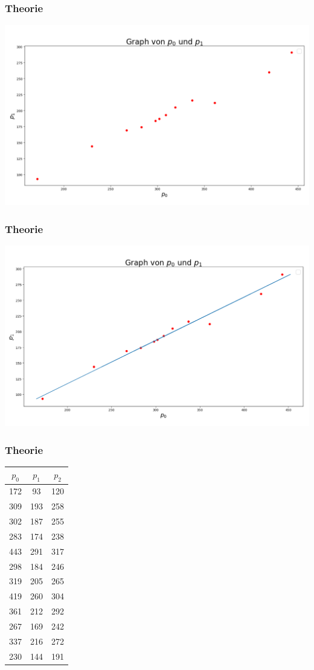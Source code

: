 \documentclass{beamer}
\begin{document}
\begin{frame}
    \centering
    \frametitle{Theorie}
    \includegraphics[width=\textwidth]{scatter.png}
\end{frame}

\begin{frame}
    \frametitle{Theorie}
    \includegraphics[width=\textwidth]{plot.png}
\end{frame}

\begin{frame}
    \frametitle{Theorie}
    \begin{center}
        \begin{tabular}{ c c c }
            $p_0$ & $p_1$ & $p_2$ \\
            \hline
            172 & 93 & 120 \\
            309 & 193 & 258 \\
            302 & 187 & 255 \\
            283 & 174 & 238 \\
            443 & 291 & 317 \\
            298 & 184 & 246 \\
            319 & 205 & 265 \\
            419 & 260 & 304 \\
            361 & 212 & 292 \\
            267 & 169 & 242 \\
            337 & 216 & 272 \\
            230 & 144 & 191
        \end{tabular}
    \end{center}    
\end{frame}
\end{document}
